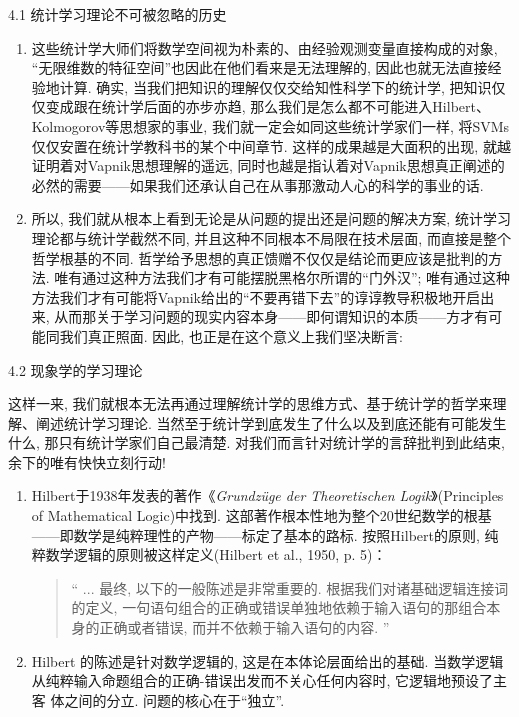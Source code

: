 \documentclass[compress,10pt,dvipsnames,notheorems]{beamer} %
\begin{document}
\begin{frame}{4.1 统计学习理论不可被忽略的历史}
\begin{enumerate}
\item 这些统计学大师们将数学空间视为朴素的、由经验观测变量直接构成的对象, “无限维数的特征空间”也因此在他们看来是无法理解的, 因此也就无法直接经验地计算. 确实, 当我们把知识的理解仅仅交给知性科学下的统计学, 把知识仅仅变成跟在统计学后面的亦步亦趋, 那么我们是怎么都不可能进入Hilbert、Kolmogorov等思想家的事业, 我们就一定会如同这些统计学家们一样, 将SVMs仅仅安置在统计学教科书的某个中间章节. 这样的成果越是大面积的出现, 就越证明着对Vapnik思想理解的遥远, 同时也越是指认着对Vapnik思想真正阐述的必然的需要——如果我们还承认自己在从事那激动人心的科学的事业的话.
\item 所以, 我们就从根本上看到无论是从问题的提出还是问题的解决方案, 统计学习理论都与统计学截然不同, 并且这种不同根本不局限在技术层面, 而直接是整个哲学根基的不同. 哲学给予思想的真正馈赠不仅仅是结论而更应该是批判的方法. 唯有通过这种方法我们才有可能摆脱黑格尔所谓的“门外汉”; 唯有通过这种方法我们才有可能将Vapnik给出的“不要再错下去”的谆谆教导积极地开启出来, 从而那关于学习问题的现实内容本身——即何谓知识的本质——方才有可能同我们真正照面. 因此, 也正是在这个意义上我们坚决断言: 
\begin{center}
{\color{red}{统计学习理论不是统计学.}}
\end{center}
\end{enumerate}
\end{frame}

\begin{frame}{4.2 现象学的学习理论}
\begin{solu}
这样一来, 我们就根本无法再通过理解统计学的思维方式、基于统计学的哲学来理解、阐述统计学习理论. 当然至于统计学到底发生了什么以及到底还能有可能发生什么, 那只有统计学家们自己最清楚. 对我们而言针对统计学的言辞批判到此结束, 余下的唯有快快立刻行动!
\end{solu}
\begin{solu}
\begin{enumerate}
\item Hilbert于1938年发表的著作《\textit{Grundz\"{u}ge der Theoretischen Logik}》(Principles of Mathematical Logic)中找到. 这部著作根本性地为整个20世纪数学的根基——即数学是纯粹理性的产物——标定了基本的路标. 按照Hilbert的原则, 纯粹数学逻辑的原则被这样定义(Hilbert et al., 1950, p. 5)：

\begin{quotation}
{\ttfamily
“
... 最终, 以下的一般陈述是非常重要的. 根据我们对诸基础逻辑连接词的定义, \textsf{一句语句组合的正确或错误单独地依赖于输入语句的那组合本身的正确或者错误, 而并不依赖于输入语句的内容.}
”
}
\end{quotation}
\item Hilbert 的陈述是针对数学逻辑的, 这是在本体论层面给出的基础. 当数学逻辑从纯粹输入命题组合的正确-错误出发而不关心任何内容时, 它逻辑地预设了主客
体之间的分立.  问题的核心在于“独立”.
\end{enumerate}
\end{solu}
\end{frame}
\end{document}
